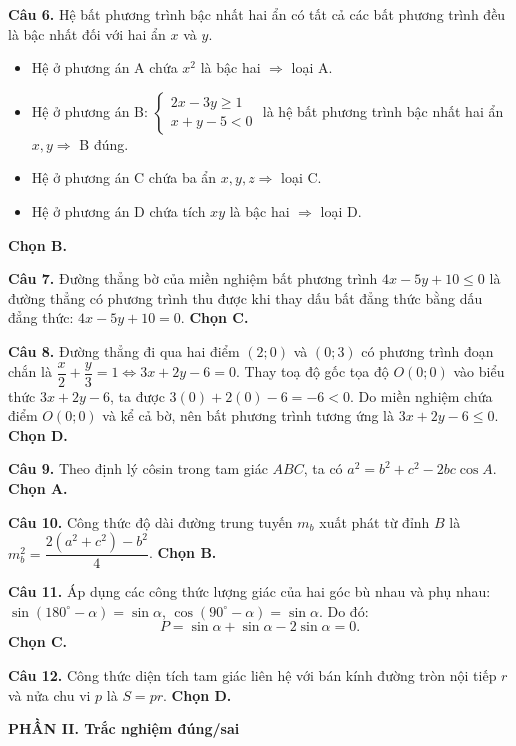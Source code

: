 \documentclass[12pt,a4paper]{article}
\begin{document}
\textbf{Câu 6.} Hệ bất phương trình bậc nhất hai ẩn có tất cả các bất phương trình đều là bậc nhất đối với hai ẩn $x$ và $y$.
\begin{itemize}[leftmargin=0.5cm, itemsep=1pt, topsep=1pt]
    \item Hệ ở phương án A chứa $x^2$ là bậc hai $\Rightarrow$ loại A.
    \item Hệ ở phương án B: $\begin{cases} 2x - 3y \ge 1 \\ x + y - 5 < 0 \end{cases}$ là hệ bất phương trình bậc nhất hai ẩn $x, y \Rightarrow$ B đúng.
    \item Hệ ở phương án C chứa ba ẩn $x, y, z \Rightarrow$ loại C.
    \item Hệ ở phương án D chứa tích $xy$ là bậc hai $\Rightarrow$ loại D.
\end{itemize}
\textbf{Chọn B.}

\textbf{Câu 7.} Đường thẳng bờ của miền nghiệm bất phương trình $4x - 5y + 10 \le 0$ là đường thẳng có phương trình thu được khi thay dấu bất đẳng thức bằng dấu đẳng thức: $4x - 5y + 10 = 0$. \textbf{Chọn C.}

\textbf{Câu 8.} Đường thẳng đi qua hai điểm $(2; 0)$ và $(0; 3)$ có phương trình đoạn chắn là $\dfrac{x}{2} + \dfrac{y}{3} = 1 \iff 3x + 2y - 6 = 0$. Thay toạ độ gốc tọa độ $O(0; 0)$ vào biểu thức $3x + 2y - 6$, ta được $3(0) + 2(0) - 6 = -6 < 0$. Do miền nghiệm chứa điểm $O(0; 0)$ và kể cả bờ, nên bất phương trình tương ứng là $3x + 2y - 6 \le 0$. \textbf{Chọn D.}

\textbf{Câu 9.} Theo định lý côsin trong tam giác $ABC$, ta có $a^2 = b^2 + c^2 - 2bc \cos A$. \textbf{Chọn A.}

\textbf{Câu 10.} Công thức độ dài đường trung tuyến $m_b$ xuất phát từ đỉnh $B$ là $m_b^2 = \dfrac{2(a^2 + c^2) - b^2}{4}$. \textbf{Chọn B.}

\textbf{Câu 11.} Áp dụng các công thức lượng giác của hai góc bù nhau và phụ nhau:
$\sin(180^\circ - \alpha) = \sin \alpha$, $\cos(90^\circ - \alpha) = \sin \alpha$.
Do đó:
\[
P = \sin \alpha + \sin \alpha - 2\sin \alpha = 0.
\]
\textbf{Chọn C.}

\textbf{Câu 12.} Công thức diện tích tam giác liên hệ với bán kính đường tròn nội tiếp $r$ và nửa chu vi $p$ là $S = pr$. \textbf{Chọn D.}

\vspace{0.2cm}
\textbf{\large PHẦN II. Trắc nghiệm đúng/sai}
\end{document}
